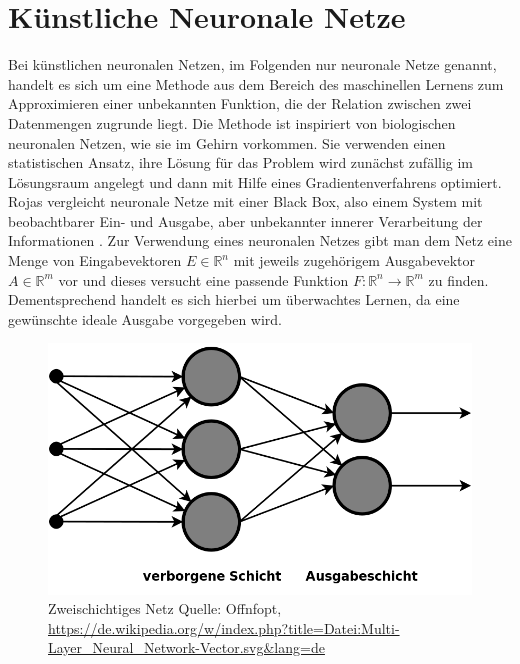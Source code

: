\documentclass[
	12pt,
	a4paper,
	BCOR10mm,
	DIV14,
	listof=totoc,
	bibliography=totoc,
	headsepline
]{scrreprt}
\begin{document}
\section{Künstliche Neuronale Netze}
\label{back_nn}
Bei künstlichen neuronalen Netzen, im Folgenden nur neuronale Netze genannt, handelt es sich um eine Methode aus dem Bereich des maschinellen Lernens zum Approximieren einer unbekannten Funktion, die der Relation zwischen zwei Datenmengen zugrunde liegt. Die Methode ist inspiriert von biologischen neuronalen Netzen, wie sie im Gehirn vorkommen. 
Sie verwenden einen statistischen Ansatz, ihre Lösung für das Problem wird zunächst zufällig im Lösungsraum angelegt und dann mit Hilfe eines Gradientenverfahrens optimiert.
Rojas vergleicht neuronale Netze mit einer Black Box, also einem System mit beobachtbarer Ein- und Ausgabe, aber unbekannter innerer Verarbeitung der Informationen \cite{Rojas:1996:NNS:235222}. 
Zur Verwendung eines neuronalen Netzes gibt man dem Netz eine Menge von Eingabevektoren $E \in \mathbb{R}^n$ mit jeweils zugehörigem Ausgabevektor $A \in \mathbb{R}^m$ vor und dieses versucht eine passende Funktion $F: \mathbb{R}^n \rightarrow \mathbb{R}^m$ zu finden. Dementsprechend handelt es sich hierbei um überwachtes Lernen, da eine gewünschte ideale Ausgabe vorgegeben wird.

\begin{figure}[h]
	\begin{center}
		\includegraphics[totalheight=0.2\textheight]{Bilder/Multi-Layer_Neural_Network-Vector.png}
	\end{center}
	\caption{Zweischichtiges Netz Quelle: Offnfopt, \url{https://de.wikipedia.org/w/index.php?title=Datei:Multi-Layer_Neural_Network-Vector.svg&lang=de}}
	\label{fig:Schichten}
\end{figure}
\end{document}
